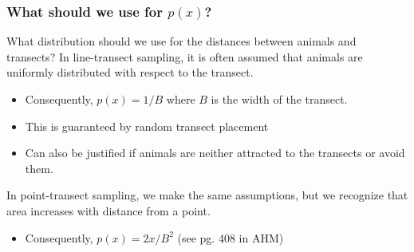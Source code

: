 \documentclass[color=usenames,dvipsnames]{beamer}\usepackage[]{graphicx}\usepackage[]{color}
\begin{document}
\begin{frame}
  \frametitle{What should we use for $p(x)$?}
  What distribution should we use for the distances between animals
  and transects?
  \pause
  \vfill
  In \alert{line-transect sampling}, it is often assumed that animals
  are uniformly distributed with respect to the transect.
  \begin{itemize}
    \item Consequently, $p(x) = 1/B$ where $B$ is the width of the
      transect.
    \item This is guaranteed by random transect placement
    \item Can also be justified if animals are neither attracted to
      the transects or avoid them. 
  \end{itemize}
  \pause
  \vfill
  In \alert{point-transect sampling}, we make the same assumptions,
  but we recognize that area increases with distance from a point.
  \begin{itemize}
    \item Consequently, $p(x) = 2x/B^2$ (see pg. 408 in AHM)
  \end{itemize}
\end{frame}
\end{document}
